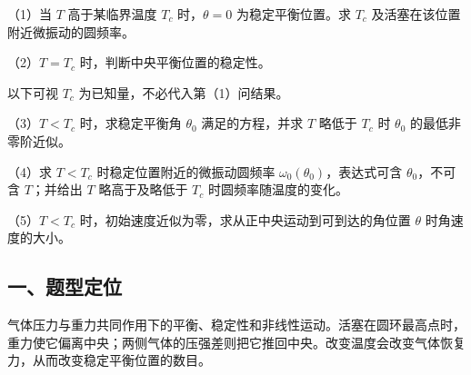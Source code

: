 \documentclass[12pt,a4paper,fontset=fandol]{ctexart}
\begin{document}
\begin{center}
\begin{minipage}{\linewidth}
\centering\begingroup{}
\ifdim\wd\diagrambox>.88\linewidth
\sbox{\diagrambox}{\resizebox{.88\linewidth}{!}{\usebox{\diagrambox}}}\fi
\ifdim\ht\diagrambox>.38\textheight
\resizebox{!}{.38\textheight}{\usebox{\diagrambox}}
\else\usebox{\diagrambox}\fi
\par{}\endgroup\end{minipage}\end{center}

（1）当 \(T\) 高于某临界温度 \(T_c\) 时，\(\theta=0\) 为稳定平衡位置。求
\(T_c\) 及活塞在该位置附近微振动的圆频率。

（2）\(T=T_c\) 时，判断中央平衡位置的稳定性。

以下可视 \(T_c\) 为已知量，不必代入第（1）问结果。

（3）\(T<T_c\) 时，求稳定平衡角 \(\theta_0\) 满足的方程，并求 \(T\)
略低于 \(T_c\) 时 \(\theta_0\) 的最低非零阶近似。

（4）求 \(T<T_c\) 时稳定位置附近的微振动圆频率
\(\omega_0(\theta_0)\)，表达式可含 \(\theta_0\)，不可含 \(T\)；并给出
\(T\) 略高于及略低于 \(T_c\) 时圆频率随温度的变化。

（5）\(T<T_c\) 时，初始速度近似为零，求从正中央运动到可到达的角位置
\(\theta\) 时角速度的大小。

\subsection{一、题型定位}\label{ux4e00ux9898ux578bux5b9aux4f4d-1}

气体压力与重力共同作用下的平衡、稳定性和非线性运动。活塞在圆环最高点时，重力使它偏离中央；两侧气体的压强差则把它推回中央。改变温度会改变气体恢复力，从而改变稳定平衡位置的数目。
\end{document}
